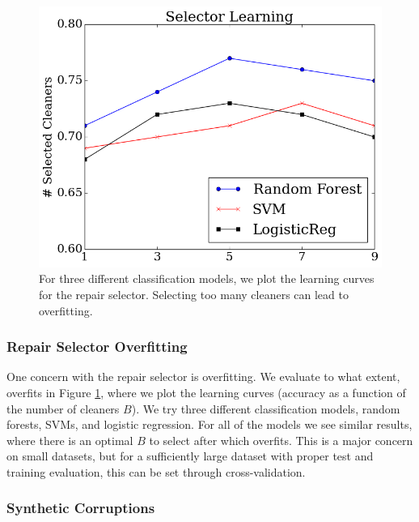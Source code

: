  \begin{figure}[t]
\centering
 \includegraphics[width=0.8\columnwidth]{exp/learn.png}
 \caption{For three different classification models, we plot the learning curves for the repair selector. Selecting too many cleaners can lead to overfitting.
 \label{fig:learning}}
\end{figure}
 
 \subsubsection{Repair Selector Overfitting}
 One concern with the repair selector is overfitting. We evaluate to what extent, \sys overfits in Figure \ref{fig:learning}, where we plot the learning curves (accuracy as a function of the number of cleaners $B$).
 We try three different classification models, random forests, SVMs, and logistic regression.
 For all of the models we see similar results, where there is an optimal $B$ to select after which \sys overfits.
This is a major concern on small datasets, but for a sufficiently large dataset with proper test and training evaluation, this can be set through cross-validation. 

\subsubsection{Synthetic Corruptions}

 


